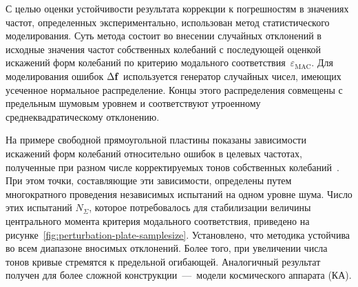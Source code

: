 С целью оценки устойчивости результата коррекции к погрешностям в значениях частот, определенных экспериментально, использован метод статистического моделирования. Суть метода состоит во внесении случайных отклонений в исходные значения частот собственных колебаний с последующей оценкой искажений форм колебаний по критерию модального соответствия~$ \varepsilon_{\mathrm{MAC}} $. Для моделирования ошибок $\Delta \mathbf{f} $ используется генератор случайных чисел, имеющих усеченное нормальное распределение. Концы этого распределения совмещены с предельным шумовым уровнем и соответствуют утроенному среднеквадратическому отклонению. 

На примере свободной прямоугольной пластины показаны зависимости искажений форм колебаний относительно ошибок в целевых частотах, полученные при разном числе корректируемых тонов собственных колебаний~. При этом точки, составляющие эти зависимости, определены путем многократного проведения независимых испытаний на одном уровне шума. Число этих испытаний $ N_\Sigma $, которое потребовалось для стабилизации величины центрального момента критерия модального соответствия, приведено на рисунке~\ref{fig:perturbation-plate-samplesize}. Установлено, что методика устойчива во всем диапазоне вносимых отклонений. Более того, при увеличении числа тонов кривые стремятся к предельной огибающей. Аналогичный результат получен для более сложной конструкции~---~модели космического аппарата (КА).

